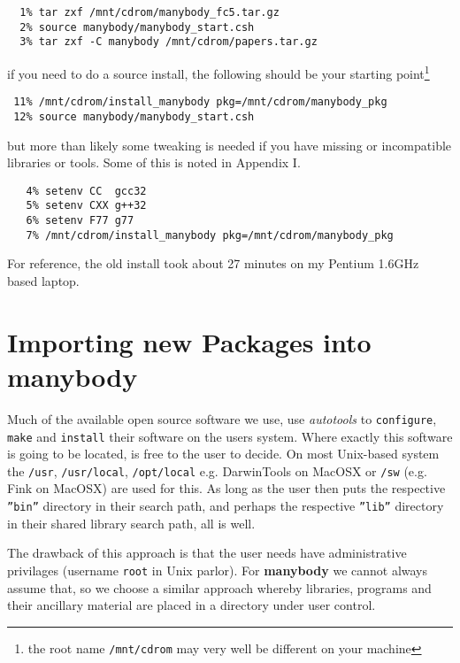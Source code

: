 \footnotesize\begin{verbatim}
  1% tar zxf /mnt/cdrom/manybody_fc5.tar.gz
  2% source manybody/manybody_start.csh
  3% tar zxf -C manybody /mnt/cdrom/papers.tar.gz

\end{verbatim}\normalsize

if you need to do a source install, the following should be 
your starting point\footnote{the root name {\tt /mnt/cdrom} may
very well be different on your machine}

\footnotesize\begin{verbatim}
 11% /mnt/cdrom/install_manybody pkg=/mnt/cdrom/manybody_pkg
 12% source manybody/manybody_start.csh
\end{verbatim}\normalsize

but more than likely some tweaking is needed if you have missing or
incompatible libraries or tools. Some of this is noted in Appendix I.


\footnotesize\begin{verbatim}
   4% setenv CC  gcc32
   5% setenv CXX g++32
   6% setenv F77 g77
   7% /mnt/cdrom/install_manybody pkg=/mnt/cdrom/manybody_pkg
\end{verbatim}\normalsize


For reference, the old install took about 27 minutes on my Pentium 1.6GHz based
laptop.

\section{Importing new Packages into manybody}

Much of the available open source software we use, use
{\it autotools} to {\tt configure}, {\tt make} and {\tt install} their
software on the users system. Where exactly this software is going to be located,
is free to the user to decide. On most Unix-based system the {\tt /usr},
{\tt /usr/local}, {\tt /opt/local} {e.g. DarwinTools on MacOSX} 
or {\tt /sw} (e.g. Fink on MacOSX) are used for this.
As long
as the user then puts the respective {\tt ''bin''} directory in their search
path, and perhaps the respective {\tt ''lib''}  directory in their 
shared library search path, all is well.

The drawback of this approach is that the user needs have administrative
privilages (username {\tt root} in Unix parlor). For {\bf manybody} we
cannot always assume that, so we choose a similar approach whereby libraries, programs
and their ancillary material are placed in a directory under user control.


